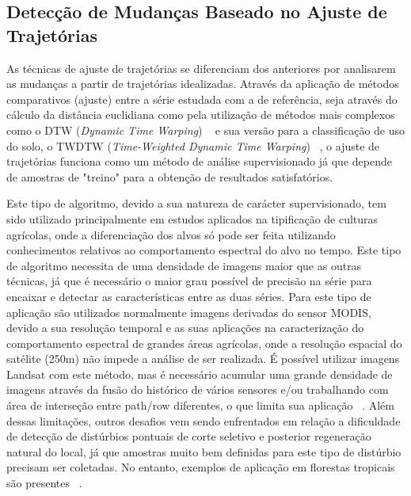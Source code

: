 \documentclass[twocolumn]{article}
\begin{document}
\subsection{Detecção de Mudanças Baseado no Ajuste de Trajetórias}
As técnicas de ajuste de trajetórias se diferenciam dos anteriores por analisarem as mudanças a partir de trajetórias idealizadas. Através da aplicação de métodos comparativos (ajuste) entre a série estudada com a de referência, seja através do cálculo da distância euclidiana como pela utilização de métodos mais complexos como o DTW (\textit{Dynamic Time Warping}) ~\cite{VELICHKO1970223, SakoeChiba71, Berndt1994} e sua versão para a classificação de uso do solo, o TWDTW (\textit{Time-Weighted Dynamic Time Warping}) ~\cite{Maus2016, Maus2019}, o ajuste de trajetórias funciona como um método de análise supervisionado já que depende de amostras de "treino" para a obtenção de resultados satisfatórios.
\par
Este tipo de algoritmo, devido a sua natureza de carácter supervisionado, tem sido utilizado principalmente em estudos aplicados na tipificação de culturas agrícolas, onde a diferenciação dos alvos só pode ser feita utilizando conhecimentos relativos ao comportamento espectral do alvo no tempo. Este tipo de algoritmo necessita de uma densidade de imagens maior que as outras técnicas, já que é necessário o maior grau possível de precisão na série para encaixar e detectar as características entre as duas séries. Para este tipo de aplicação são utilizados normalmente imagens derivadas do sensor MODIS, devido a sua resolução temporal e as suas aplicações na caracterização do comportamento espectral de grandes áreas agrícolas, onde a resolução espacial do satélite (250m) não impede a análise de ser realizada. É possível utilizar imagens Landsat com este método, mas é necessário acumular uma grande densidade de imagens através da fusão do histórico de vários sensores e/ou trabalhando com área de interseção entre path/row diferentes, o que limita sua aplicação ~\cite{Bendini2016}. Além dessas limitações, outros desafios vem sendo enfrentados em relação a dificuldade de detecção de distúrbios pontuais de corte seletivo e posterior regeneração natural do local, já que amostras muito bem definidas para este tipo de distúrbio precisam ser coletadas. No entanto, exemplos de aplicação em florestas tropicais são presentes ~\cite{Hirschmugl2013, KENNEDY2007370}.
\end{document}
